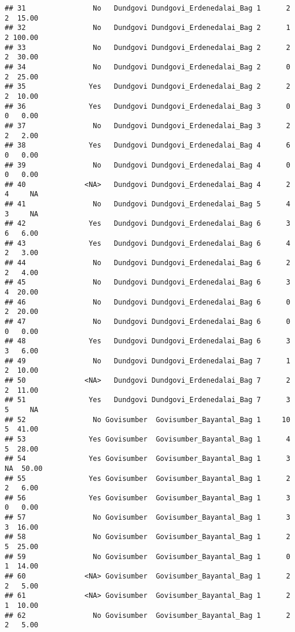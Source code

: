\documentclass[
]{article}
\begin{document}
\begin{verbatim}
## 31                No   Dundgovi Dundgovi_Erdenedalai_Bag 1      2      2  15.00
## 32                No   Dundgovi Dundgovi_Erdenedalai_Bag 2      1      2 100.00
## 33                No   Dundgovi Dundgovi_Erdenedalai_Bag 2      2      2  30.00
## 34                No   Dundgovi Dundgovi_Erdenedalai_Bag 2      0      2  25.00
## 35               Yes   Dundgovi Dundgovi_Erdenedalai_Bag 2      2      2  10.00
## 36               Yes   Dundgovi Dundgovi_Erdenedalai_Bag 3      0      0   0.00
## 37                No   Dundgovi Dundgovi_Erdenedalai_Bag 3      2      2   2.00
## 38               Yes   Dundgovi Dundgovi_Erdenedalai_Bag 4      6      0   0.00
## 39                No   Dundgovi Dundgovi_Erdenedalai_Bag 4      0      0   0.00
## 40              <NA>   Dundgovi Dundgovi_Erdenedalai_Bag 4      2      4     NA
## 41                No   Dundgovi Dundgovi_Erdenedalai_Bag 5      4      3     NA
## 42               Yes   Dundgovi Dundgovi_Erdenedalai_Bag 6      3      6   6.00
## 43               Yes   Dundgovi Dundgovi_Erdenedalai_Bag 6      4      2   3.00
## 44                No   Dundgovi Dundgovi_Erdenedalai_Bag 6      2      2   4.00
## 45                No   Dundgovi Dundgovi_Erdenedalai_Bag 6      3      4  20.00
## 46                No   Dundgovi Dundgovi_Erdenedalai_Bag 6      0      2  20.00
## 47                No   Dundgovi Dundgovi_Erdenedalai_Bag 6      0      0   0.00
## 48               Yes   Dundgovi Dundgovi_Erdenedalai_Bag 6      3      3   6.00
## 49                No   Dundgovi Dundgovi_Erdenedalai_Bag 7      1      2  10.00
## 50              <NA>   Dundgovi Dundgovi_Erdenedalai_Bag 7      2      2  11.00
## 51               Yes   Dundgovi Dundgovi_Erdenedalai_Bag 7      3      5     NA
## 52                No Govisumber  Govisumber_Bayantal_Bag 1     10      5  41.00
## 53               Yes Govisumber  Govisumber_Bayantal_Bag 1      4      5  28.00
## 54               Yes Govisumber  Govisumber_Bayantal_Bag 1      3     NA  50.00
## 55               Yes Govisumber  Govisumber_Bayantal_Bag 1      2      2   6.00
## 56               Yes Govisumber  Govisumber_Bayantal_Bag 1      3      0   0.00
## 57                No Govisumber  Govisumber_Bayantal_Bag 1      3      3  16.00
## 58                No Govisumber  Govisumber_Bayantal_Bag 1      2      5  25.00
## 59                No Govisumber  Govisumber_Bayantal_Bag 1      0      1  14.00
## 60              <NA> Govisumber  Govisumber_Bayantal_Bag 1      2      2   5.00
## 61              <NA> Govisumber  Govisumber_Bayantal_Bag 1      2      1  10.00
## 62                No Govisumber  Govisumber_Bayantal_Bag 1      2      2   5.00

\end{verbatim}
\end{document}
